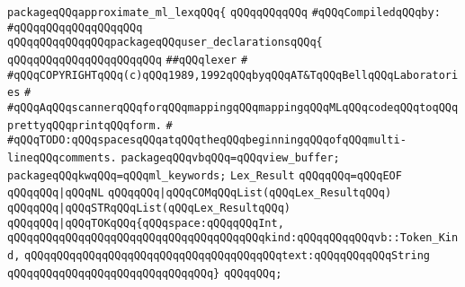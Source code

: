 \label{src/lib/x-kit/widget/old/fancy/graphviz/text/approximate-ml.lex.pkg}
\verb|packageqQQqapproximate_ml_lexqQQq{|\newline
\verb|qQQqqQQqqQQq|\newline
\verb|#qQQqCompiledqQQqby:|\newline
\verb|#qQQqqQQqqQQqqQQqqQQq|\newline
\newline
\verb|qQQqqQQqqQQqqQQqpackageqQQquser_declarationsqQQq{|\newline
\verb|qQQqqQQqqQQqqQQqqQQqqQQq|\newline
\verb|##qQQqlexer|\newline
\verb|#|\newline
\verb|#qQQqCOPYRIGHTqQQq(c)qQQq1989,1992qQQqbyqQQqAT&TqQQqBellqQQqLaboratories|\newline
\verb|#|\newline
\verb|#qQQqAqQQqscannerqQQqforqQQqmappingqQQqmappingqQQqMLqQQqcodeqQQqtoqQQqprettyqQQqprintqQQqform.|\newline
\verb|#|\newline
\verb|#qQQqTODO:qQQqspacesqQQqatqQQqtheqQQqbeginningqQQqofqQQqmulti-lineqQQqcomments.|\newline
\newline
\newline
\verb|packageqQQqvbqQQq=qQQqview_buffer;|\newline
\verb|packageqQQqkwqQQq=qQQqml_keywords;|\newline
\newline
\verb|Lex_Result|\newline
\verb|qQQqqQQq=qQQqEOF|\newline
\verb|qQQqqQQq|\verb#|qQQqNL#\newline
\verb|qQQqqQQq|\verb#|qQQqCOMqQQqList(qQQqLex_ResultqQQq)#\newline
\verb|qQQqqQQq|\verb#|qQQqSTRqQQqList(qQQqLex_ResultqQQq)#\newline
\verb|qQQqqQQq|\verb#|qQQqTOKqQQq{qQQqspace:qQQqqQQqInt,#\newline
\verb|qQQqqQQqqQQqqQQqqQQqqQQqqQQqqQQqqQQqqQQqkind:qQQqqQQqqQQqvb::Token_Kind,|\newline
\verb|qQQqqQQqqQQqqQQqqQQqqQQqqQQqqQQqqQQqqQQqtext:qQQqqQQqqQQqString|\newline
\verb|qQQqqQQqqQQqqQQqqQQqqQQqqQQqqQQq}|\newline
\verb|qQQqqQQq;|\newline
